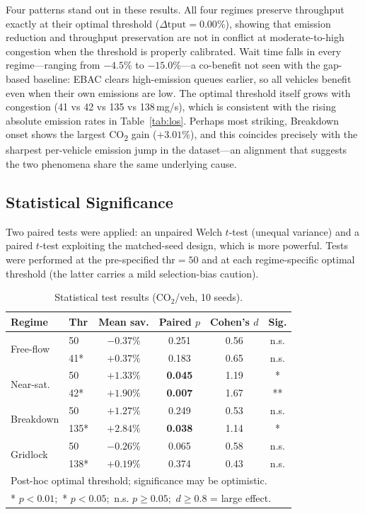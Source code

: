 \documentclass[review,3p,authoryear,times]{elsarticle}
\begin{document}
Four patterns stand out in these results. All four regimes preserve
throughput exactly at their optimal threshold ($\Delta\text{tput}=0.00\%$),
showing that emission reduction and throughput preservation are not in
conflict at moderate-to-high congestion when the threshold is properly
calibrated. Wait time falls in every regime---ranging from $-4.5\%$ to
$-15.0\%$---a co-benefit not seen with the gap-based baseline: EBAC clears
high-emission queues earlier, so all vehicles benefit even when their own
emissions are low. The optimal threshold itself grows with congestion (41
vs 42 vs 135 vs 138\,mg/s), which is consistent with the rising absolute
emission rates in Table~\ref{tab:los}. Perhaps most striking, Breakdown
onset shows the largest CO\textsubscript{2} gain ($+3.01\%$), and this
coincides precisely with the sharpest per-vehicle emission jump in the
dataset---an alignment that suggests the two phenomena share the same
underlying cause.

\subsection{Statistical Significance}
\label{sec:stats}

Two paired tests were applied: an unpaired Welch $t$-test (unequal
variance) and a paired $t$-test exploiting the matched-seed design, which
is more powerful. Tests were performed at the pre-specified
$\text{thr}=50$ and at each regime-specific optimal threshold (the latter
carries a mild selection-bias caution).

\begin{table}[H]
  \centering
  \caption{Statistical test results (CO$_2$/veh, 10 seeds).}
  \label{tab:stats}
  \begin{tabular}{llcccc}
    \toprule
    \textbf{Regime} & \textbf{Thr} & \textbf{Mean sav.} &
    \textbf{Paired $p$} & \textbf{Cohen's $d$} & \textbf{Sig.} \\
    \midrule
    \multirow{2}{*}{Free-flow}
      & 50   & $-0.37\%$ & 0.251 & 0.56 & n.s. \\
      & 41*  & $+0.37\%$ & 0.183 & 0.65 & n.s. \\[3pt]
    \multirow{2}{*}{Near-sat.}
      & 50   & $+1.33\%$ & \textbf{0.045} & 1.19 & * \\
      & 42*  & $+1.90\%$ & \textbf{0.007} & 1.67 & ** \\[3pt]
    \multirow{2}{*}{Breakdown}
      & 50   & $+1.27\%$ & 0.249 & 0.53 & n.s. \\
      & 135* & $+2.84\%$ & \textbf{0.038} & 1.14 & * \\[3pt]
    \multirow{2}{*}{Gridlock}
      & 50   & $-0.26\%$ & 0.065 & 0.58 & n.s. \\
      & 138* & $+0.19\%$ & 0.374 & 0.43 & n.s. \\
    \bottomrule
    \multicolumn{6}{l}{\footnotesize * Post-hoc optimal threshold; significance may be optimistic.} \\
    \multicolumn{6}{l}{\footnotesize ** $p<0.01$;\ * $p<0.05$;\ n.s. $p\geq 0.05$;\ $d\geq 0.8$ = large effect.} \\
  \end{tabular}
\end{table}
\end{document}
